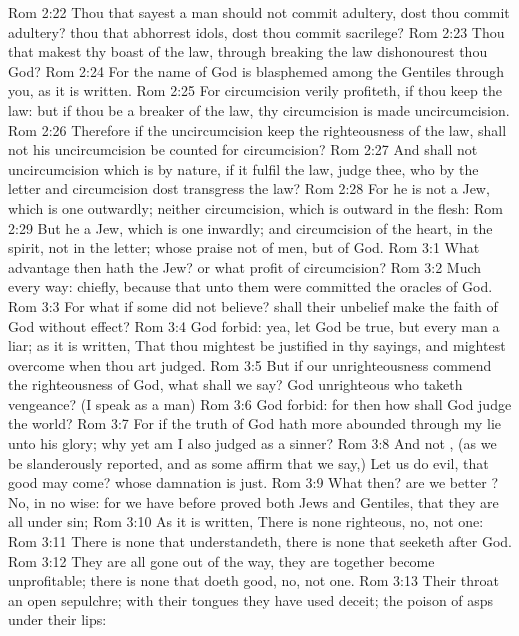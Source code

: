 \vs Rom 2:22 Thou that sayest a man should not commit adultery, dost thou commit adultery? thou that abhorrest idols, dost thou commit sacrilege?
\vs Rom 2:23 Thou that makest thy boast of the law, through breaking the law dishonourest thou God?
\vs Rom 2:24 For the name of God is blasphemed among the Gentiles through you, as it is written.
\vs Rom 2:25 For circumcision verily profiteth, if thou keep the law: but if thou be a breaker of the law, thy circumcision is made uncircumcision.
\vs Rom 2:26 Therefore if the uncircumcision keep the righteousness of the law, shall not his uncircumcision be counted for circumcision?
\vs Rom 2:27 And shall not uncircumcision which is by nature, if it fulfil the law, judge thee, who by the letter and circumcision dost transgress the law?
\vs Rom 2:28 For he is not a Jew, which is one outwardly; neither  circumcision, which is outward in the flesh:
\vs Rom 2:29 But he  a Jew, which is one inwardly; and circumcision  of the heart, in the spirit,  not in the letter; whose praise  not of men, but of God.
\vs Rom 3:1 What advantage then hath the Jew? or what profit  of circumcision?
\vs Rom 3:2 Much every way: chiefly, because that unto them were committed the oracles of God.
\vs Rom 3:3 For what if some did not believe? shall their unbelief make the faith of God without effect?
\vs Rom 3:4 God forbid: yea, let God be true, but every man a liar; as it is written, That thou mightest be justified in thy sayings, and mightest overcome when thou art judged.
\vs Rom 3:5 But if our unrighteousness commend the righteousness of God, what shall we say?  God unrighteous who taketh vengeance? (I speak as a man)
\vs Rom 3:6 God forbid: for then how shall God judge the world?
\vs Rom 3:7 For if the truth of God hath more abounded through my lie unto his glory; why yet am I also judged as a sinner?
\vs Rom 3:8 And not , (as we be slanderously reported, and as some affirm that we say,) Let us do evil, that good may come? whose damnation is just.
\vs Rom 3:9 What then? are we better ? No, in no wise: for we have before proved both Jews and Gentiles, that they are all under sin;
\vs Rom 3:10 As it is written, There is none righteous, no, not one:
\vs Rom 3:11 There is none that understandeth, there is none that seeketh after God.
\vs Rom 3:12 They are all gone out of the way, they are together become unprofitable; there is none that doeth good, no, not one.
\vs Rom 3:13 Their throat  an open sepulchre; with their tongues they have used deceit; the poison of asps  under their lips:
